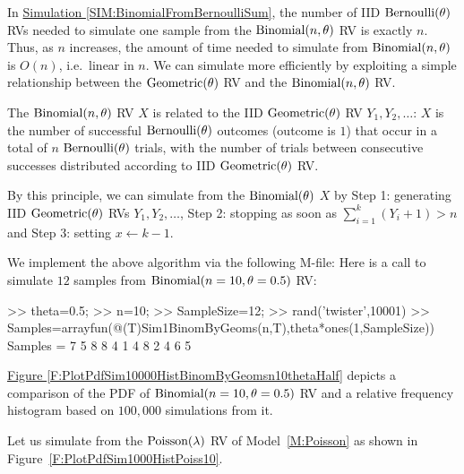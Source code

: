 In \hyperref[SIM:BinomialFromBernoulliSum]{Simulation \ref*{SIM:BinomialFromBernoulliSum}}, the number of IID $\mbox{{\rm Bernoulli}}(\theta)$ RVs needed to simulate one sample from the $\mbox{{\rm Binomial}}(n,\theta)$ RV is exactly $n$.  Thus, as $n$ increases, the amount of time needed to simulate from $\mbox{{\rm Binomial}}(n,\theta)$ is $O(n)$, i.e.~linear in $n$.  We can simulate more efficiently by exploiting a simple relationship between the $\mbox{{\rm Geometric}}(\theta)$ RV and the $\mbox{{\rm Binomial}}(n,\theta)$ RV.


The $\mbox{{\rm Binomial}}(n,\theta)$ RV $X$ is related to the IID $\mbox{{\rm Geometric}}(\theta)$ RV $Y_1,Y_2,\ldots$: $X$ is the number of successful $\mbox{{\rm Bernoulli}}(\theta)$ outcomes (outcome is $1$) that occur in a total of $n$ $\mbox{{\rm Bernoulli}}(\theta)$ trials, with the number of trials between consecutive successes distributed according to IID $\mbox{{\rm Geometric}}(\theta)$ RV.
\begin{simulation}\label{SIM:BinomialFromGeoms}
By this principle, we can simulate from the $\mbox{{\rm Binomial}}(\theta)$ $X$ by {\sf Step 1}: generating IID $\mbox{{\rm Geometric}}(\theta)$ RVs $Y_1,Y_2,\ldots$, {\sf Step 2}: stopping as soon as $\sum_{i=1}^k (Y_i+1) > n$ and {\sf Step 3:} setting $x \gets k-1$.

We implement the above algorithm via the following M-file:
Here is a call to simulate $12$ samples from $\mbox{{\rm Binomial}}(n=10,\theta=0.5)$ RV:
\begin{VrbM}
>> theta=0.5; %
>> n=10; %
>> SampleSize=12;%
>> rand('twister',10001) %
>> Samples=arrayfun(@(T)Sim1BinomByGeoms(n,T),theta*ones(1,SampleSize))
Samples =     7     5     8     8     4     1     4     8     2     4     6     5
\end{VrbM}
\hyperref[F:PlotPdfSim10000HistBinomByGeomsn10thetaHalf]{Figure \ref*{F:PlotPdfSim10000HistBinomByGeomsn10thetaHalf}} depicts a comparison of the PDF of $\mbox{{\rm Binomial}}(n=10,\theta=0.5)$ RV and a relative frequency histogram based on $100,000$ simulations from it.
\end{simulation}

Let us simulate from the $\mbox{{\rm Poisson}}(\lambda)$ RV of Model~\ref{M:Poisson} as shown in Figure~\ref{F:PlotPdfSim1000HistPoiss10}. %

